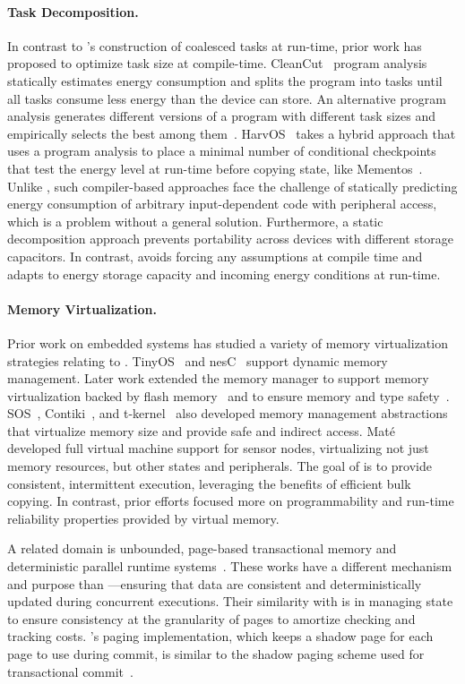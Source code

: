 \paragraph{Task Decomposition.}
In contrast to \sys's construction of coalesced tasks at run-time, prior work has proposed to optimize task size at compile-time. CleanCut~\cite{cleancut_2018} program analysis statically estimates energy consumption and splits the program into tasks until all tasks consume less energy than the device can store. An alternative program analysis generates different versions of a program with different task sizes and empirically selects the best among them~\cite{baghsorkhi_cgo_2018}. HarvOS~\cite{mottola2017harvos} takes a hybrid approach that uses a program analysis to place a minimal number of conditional checkpoints that test the energy level at run-time before copying state, like Mementos~\cite{mementos}. Unlike \sys, such compiler-based approaches face the challenge of statically predicting energy consumption of arbitrary input-dependent code with peripheral access, which is a problem without a general solution. Furthermore, a static decomposition approach prevents portability across devices with different storage capacitors. In contrast, \sys avoids forcing any assumptions at compile time and adapts to energy storage capacity and incoming energy conditions at run-time.

\paragraph{Memory Virtualization.}
Prior work on embedded systems has studied a variety of memory virtualization strategies relating to \sys.
TinyOS~\cite{levis2005tinyos} and nesC~\cite{nesc} support dynamic memory management. Later work extended the memory manager to support memory virtualization backed by flash memory~\cite{sensornetvm} and to ensure memory and type safety~\cite{tinyosmemorysafety}. SOS~\cite{sos}, Contiki~\cite{contiki}, and t-kernel~\cite{tkernel} also developed memory management abstractions that virtualize memory size and provide safe and indirect access. Mat\'e~\cite{mate} developed full virtual machine support for sensor nodes, virtualizing not just memory resources, but other states and peripherals. The goal of \sys is to provide consistent, intermittent execution, leveraging the benefits of efficient bulk copying. In contrast, prior efforts focused more on programmability and run-time reliability properties provided by virtual memory.

A related domain is unbounded, page-based transactional memory and deterministic parallel runtime systems~\cite{pagebasedtm,grace}.  These works have a different mechanism and purpose than \sys---ensuring that data are consistent and deterministically updated during concurrent executions. Their similarity with \sys is in managing state to ensure consistency at the granularity of pages to amortize checking and tracking costs. \sys's paging implementation, which keeps a shadow page for each page to use during commit, is similar to the shadow paging scheme used for transactional commit~\cite{pagebasedtm}.
